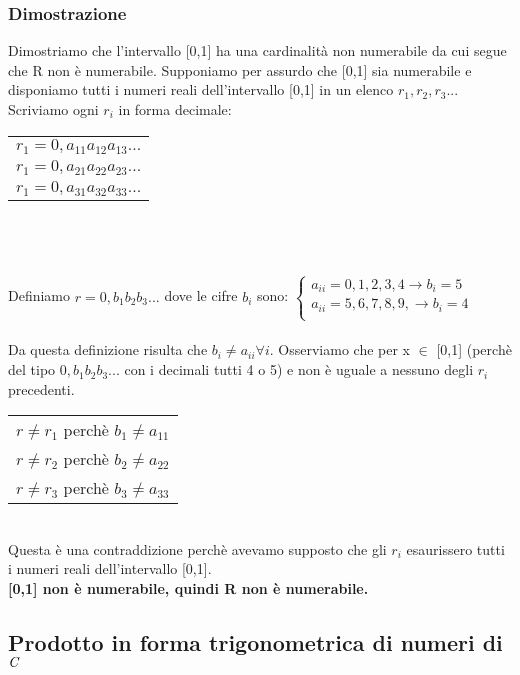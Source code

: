 \documentclass[11pt, a4paper]{article}
\begin{document}
\subsubsection*{Dimostrazione}
Dimostriamo che l'intervallo [0,1] ha una cardinalità non numerabile da cui segue che R non è numerabile. Supponiamo per assurdo che [0,1] sia numerabile e disponiamo tutti i numeri reali dell'intervallo [0,1] in un elenco $r_1, r_2,r_3...$\\ Scriviamo ogni $r_i$ in forma decimale:
\begin{tabular}{c}
\begin{math} r_1=0,a_{11} a_{12} a_{13} ... \end{math}\\
\begin{math} r_1=0,a_{21} a_{22} a_{23} ... \end{math}\\
\begin{math} r_1=0,a_{31} a_{32} a_{33} ... \end{math}
\end{tabular}
\\
\\
\\
Definiamo $r=0,b_1 b_2 b_3 ...$ dove le cifre $b_i$ sono: 
$
\left \{
\begin{array}{l}
a_{ii}=0,1,2,3,4 \rightarrow b_i=5\\
a_{ii}=5,6,7,8,9, \rightarrow b_i=4\\
\end{array}
\right.
$
\\	\\
Da questa definizione risulta che $b_i \neq a_{ii} \forall i$. Osserviamo che per x $\in$ [0,1] (perchè del tipo $ 0,b_1 b_2 b_3 ...$ con i decimali tutti 4 o 5) e non è uguale a nessuno degli $r_i$ precedenti.
\\
\begin{tabular}{l}
$r \neq r_1$ perchè $b_1 \neq a_{11}$\\
$r \neq r_2$ perchè $b_2 \neq a_{22}$\\
$r \neq r_3$ perchè $b_3 \neq a_{33}$
\end{tabular}
\\
Questa è una contraddizione perchè avevamo supposto che gli $r_i$ esaurissero tutti i numeri reali dell'intervallo [0,1].
\\
\textbf{[0,1] non è numerabile, quindi R non è numerabile.}

\subsection{Prodotto in forma trigonometrica di numeri di $\emph{C}$}
\end{document}

